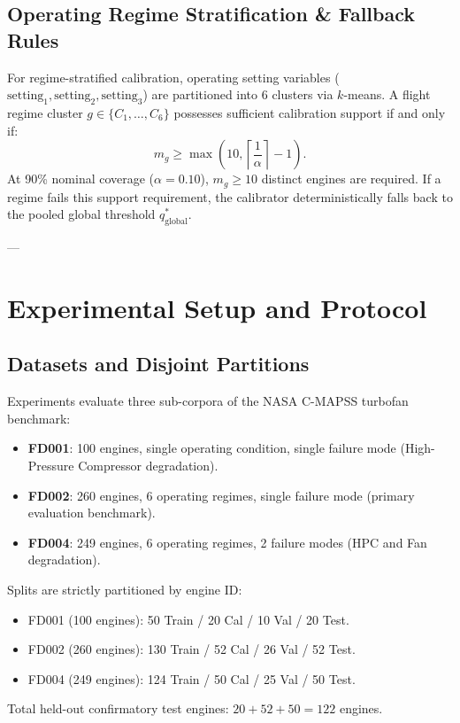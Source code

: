 \documentclass[conference]{IEEEtran}
\begin{document}
\subsection{Operating Regime Stratification & Fallback Rules}
For regime-stratified calibration, operating setting variables ($\text{setting}_1, \text{setting}_2, \text{setting}_3$) are partitioned into 6 clusters via $k$-means. A flight regime cluster $g \in \{C_1, \dots, C_6\}$ possesses sufficient calibration support if and only if:
\begin{equation}
m_g \ge \max\left(10, \left\lceil \frac{1}{\alpha} \right\rceil - 1\right).
\end{equation}
At 90\% nominal coverage ($\alpha = 0.10$), $m_g \ge 10$ distinct engines are required. If a regime fails this support requirement, the calibrator deterministically falls back to the pooled global threshold $q^*_{\text{global}}$.

---

\section{Experimental Setup and Protocol}

\subsection{Datasets and Disjoint Partitions}
Experiments evaluate three sub-corpora of the NASA C-MAPSS turbofan benchmark:
\begin{itemize}
    \item \textbf{FD001}: 100 engines, single operating condition, single failure mode (High-Pressure Compressor degradation).
    \item \textbf{FD002}: 260 engines, 6 operating regimes, single failure mode (primary evaluation benchmark).
    \item \textbf{FD004}: 249 engines, 6 operating regimes, 2 failure modes (HPC and Fan degradation).
\end{itemize}
Splits are strictly partitioned by engine ID:
\begin{itemize}
    \item FD001 (100 engines): 50 Train / 20 Cal / 10 Val / 20 Test.
    \item FD002 (260 engines): 130 Train / 52 Cal / 26 Val / 52 Test.
    \item FD004 (249 engines): 124 Train / 50 Cal / 25 Val / 50 Test.
\end{itemize}
Total held-out confirmatory test engines: $20 + 52 + 50 = 122$ engines.
\end{document}
